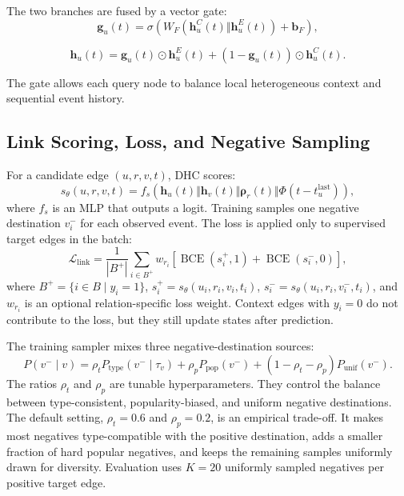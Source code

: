 The two branches are fused by a vector gate:
\begin{equation}
\mathbf{g}_{u}(t)=\sigma\left(W_F\left(\mathbf{h}^{C}_{u}(t)\Vert\mathbf{h}^{E}_{u}(t)\right)+\mathbf{b}_F\right),
\end{equation}

\begin{equation}
\mathbf{h}_{u}(t)=\mathbf{g}_{u}(t)\odot\mathbf{h}^{E}_{u}(t)+\left(1-\mathbf{g}_{u}(t)\right)\odot\mathbf{h}^{C}_{u}(t).
\end{equation}

The gate allows each query node to balance local heterogeneous context and sequential event history.
\subsection{Link Scoring, Loss, and Negative Sampling}
For a candidate edge $(u,r,v,t)$, DHC scores:
\begin{equation}
s_{\theta}(u,r,v,t)=f_s\left(\mathbf{h}_{u}(t)\Vert\mathbf{h}_{v}(t)\Vert\boldsymbol{\rho}_{r}(t)\Vert\Phi(t-t_u^{\mathrm{last}})\right),
\label{eq:score}
\end{equation}
where $f_s$ is an MLP that outputs a logit. 
Training samples one negative destination $v_i^{-}$ for each observed event. The loss is applied only to supervised target edges in the batch:
\begin{equation}
\mathcal{L}_{\mathrm{link}}=\frac{1}{|B^{+}|}\sum_{i\in B^{+}}w_{r_i}\left[
\operatorname{BCE}(s_i^{+},1)+\operatorname{BCE}(s_i^{-},0)\right],
\label{eq:link_loss}
\end{equation}
where $B^{+}=\{i\in B\mid y_i=1\}$, $s_i^{+}=s_{\theta}(u_i,r_i,v_i,t_i)$, $s_i^{-}=s_{\theta}(u_i,r_i,v_i^{-},t_i)$, and $w_{r_i}$ is an optional relation-specific loss weight. Context edges with $y_i=0$ do not contribute to the loss, but they still update states after prediction.

The training sampler mixes three negative-destination sources:
\begin{equation}
P(v^{-}\mid v)=\rho_tP_{\mathrm{type}}(v^{-}\mid \tau_v)+\rho_pP_{\mathrm{pop}}(v^{-})+(1-\rho_t-\rho_p)P_{\mathrm{unif}}(v^{-}).
\end{equation}
The ratios $\rho_t$ and $\rho_p$ are tunable hyperparameters. 
They control the balance between type-consistent, popularity-biased, and uniform negative destinations. 
The default setting, $\rho_t=0.6$ and $\rho_p=0.2$, is an empirical trade-off. 
It makes most negatives type-compatible with the positive destination, adds a smaller fraction of hard popular negatives, and keeps the remaining samples uniformly drawn for diversity. 
Evaluation uses $K=20$ uniformly sampled negatives per positive target edge.
